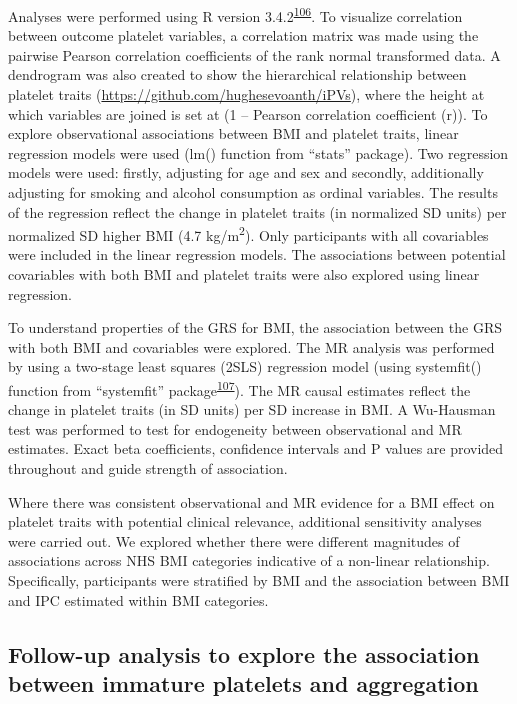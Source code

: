 \documentclass[11pt,twoside]{bristolthesis}
\begin{document}
Analyses were performed using R version 3.4.2\textsuperscript{\protect\hyperlink{ref-Team2019a}{106}}. To visualize correlation between outcome platelet variables, a correlation matrix was made using the pairwise Pearson correlation coefficients of the rank normal transformed data. A dendrogram was also created to show the hierarchical relationship between platelet traits (\url{https://github.com/hughesevoanth/iPVs}), where the height at which variables are joined is set at (1 -- Pearson correlation coefficient (r)). To explore observational associations between BMI and platelet traits, linear regression models were used (lm() function from ``stats'' package). Two regression models were used: firstly, adjusting for age and sex and secondly, additionally adjusting for smoking and alcohol consumption as ordinal variables. The results of the regression reflect the change in platelet traits (in normalized SD units) per normalized SD higher BMI (4.7 kg/m\textsuperscript{2}). Only participants with all covariables were included in the linear regression models. The associations between potential covariables with both BMI and platelet traits were also explored using linear regression.

To understand properties of the GRS for BMI, the association between the GRS with both BMI and covariables were explored. The MR analysis was performed by using a two-stage least squares (2SLS) regression model (using systemfit() function from ``systemfit'' package\textsuperscript{\protect\hyperlink{ref-Henningsen2007}{107}}). The MR causal estimates reflect the change in platelet traits (in SD units) per SD increase in BMI. A Wu-Hausman test was performed to test for endogeneity between observational and MR estimates. Exact beta coefficients, confidence intervals and P values are provided throughout and guide strength of association.

Where there was consistent observational and MR evidence for a BMI effect on platelet traits with potential clinical relevance, additional sensitivity analyses were carried out. We explored whether there were different magnitudes of associations across NHS BMI categories indicative of a non-linear relationship. Specifically, participants were stratified by BMI and the association between BMI and IPC estimated within BMI categories.

\hypertarget{follow-up-analysis-to-explore-the-association-between-immature-platelets-and-aggregation}{%
\subsection{Follow-up analysis to explore the association between immature platelets and aggregation}\label{follow-up-analysis-to-explore-the-association-between-immature-platelets-and-aggregation}}
\end{document}
